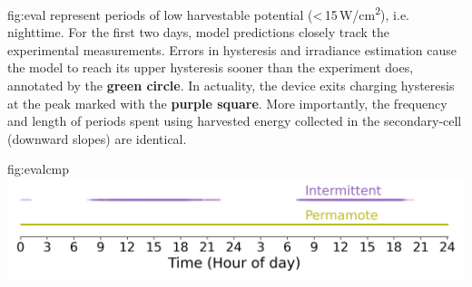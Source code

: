 \begin{definefigure}{fig:eval}
{    represent periods of low harvestable potential
    (<\,15\,\textmu W/cm\textsuperscript{2}),
    i.e. nighttime. For the first two days, model predictions
    closely track the experimental measurements. Errors
    in hysteresis and irradiance estimation cause the model to reach its upper
    hysteresis sooner than the experiment does, annotated by the
    \textbf{\textcolor{fig-green}{green circle}}. In actuality, the device
    exits charging hysteresis at the peak marked with the
    \textbf{\textcolor{fig-purple}{purple square}}.
    More importantly, the
    frequency and length of periods spent using harvested
    energy collected in the secondary-cell (downward slopes) are identical.
    }
\end{definefigure}

\begin{definefigure}{fig:evalcmp}
    \centering
    \includegraphics[width=\linewidth]{figs/capacity/experiment_sys_compare/exp_packets_recv}
    \caption{
      \normalfont
        Packets received over two days.
      This figure compares the reliability of an
      intermittent design and \name. \name sends a packet every second and does
      so without fail, while the intermittent system is only able to send when
      light is available.
      }
\end{definefigure}
